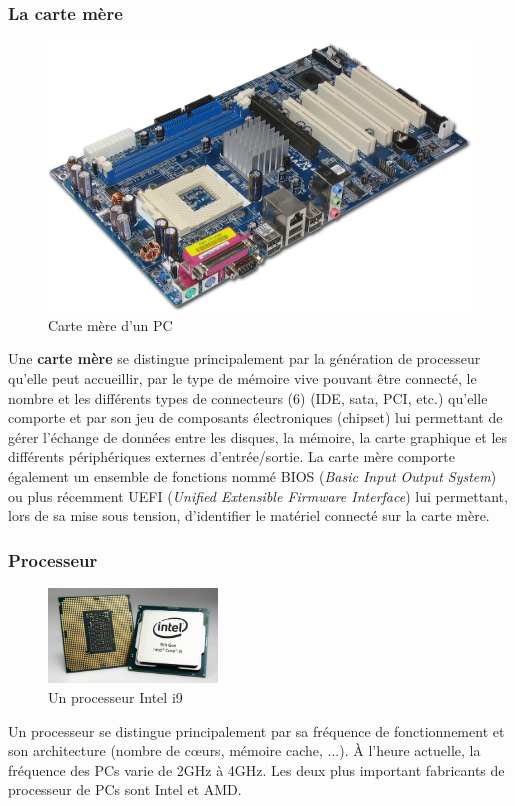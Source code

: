 \subsubsection{La carte mère}
\begin{figure}
\centering
\includegraphics[trim=0 0 0 000 ,scale=.4]{Images/ordinateur/cartemere}
\caption{Carte mère d'un PC}
\end{figure}
Une {\bf carte mère} se distingue principalement par la génération de processeur qu'elle peut accueillir, par le type de mémoire vive pouvant être connecté, le nombre et les différents types de connecteurs (6) (IDE, sata, PCI, etc.) qu'elle comporte  et par son jeu de composants électroniques (chipset) lui permettant de gérer l'échange de données entre les disques, la mémoire, la carte graphique et les différents périphériques externes d'entrée/sortie. La carte mère comporte également un ensemble de fonctions nommé BIOS ({\it Basic Input Output System}) ou plus récemment UEFI ({\it Unified Extensible Firmware Interface}) lui permettant, lors de sa mise sous tension, d'identifier le matériel connecté sur la carte mère.



\subsubsection{Processeur}
\begin{figure}
	\centering
	\includegraphics[trim=0 0 0 400 ,width=0.4\textwidth]{Images/ordinateur/processeur}	\caption{Un processeur Intel i9}
\end{figure}
Un processeur se distingue principalement par sa fréquence de fonctionnement et son architecture (nombre de cœurs, mémoire cache, ...). À l’heure actuelle, la fréquence des PCs varie de 2GHz à 4GHz. Les deux plus important fabricants de processeur de PCs sont Intel et AMD.


